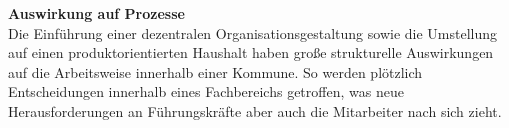 \textbf{Auswirkung auf Prozesse}\\
Die Einführung einer dezentralen Organisationsgestaltung sowie die Umstellung auf einen produktorientierten Haushalt haben große strukturelle Auswirkungen auf die Arbeitsweise innerhalb einer Kommune.
So werden plötzlich Entscheidungen innerhalb eines Fachbereichs getroffen, was neue Herausforderungen an Führungskräfte aber auch die Mitarbeiter nach sich zieht.





% 
% 
% 
% 



